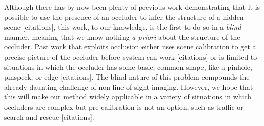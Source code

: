 Although there has by now been plenty of previous work demonstrating that it is possible to use the presence of an occluder to infer the structure of a hidden scene [citations], this work, to our knowledge, is the first to do so in a \emph{blind} manner, meaning that we know nothing \emph{a priori} about the structure of the occluder. Past work that exploits occlusion either uses scene calibration to get a precise picture of the occluder before system can work [citations] or is limited to situations in which the occluder has some basic, common shape, like a pinhole, pinspeck, or edge [citations]. The blind nature of this problem compounds the already daunting challenge of non-line-of-sight imaging. However, we hope that this will make our method widely applicable in a variety of situations in which occluders are complex but pre-calibration is not an option, such as traffic or search and rescue [citations].


